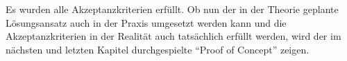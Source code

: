 \clearpage

Es wurden alle Akzeptanzkriterien erfüllt. Ob nun der in der Theorie geplante
Lösungsansatz auch in der Praxis umgesetzt werden kann und die Akzeptanzkriterien
in der Realität auch tatsächlich erfüllt werden, wird der im nächsten und
letzten Kapitel durchgespielte ``Proof of Concept'' zeigen.